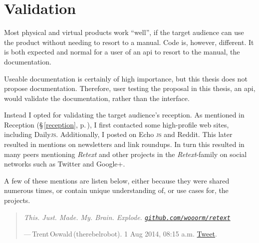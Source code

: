 
\begingroup
\let\clearpage\relax
\let\cleardoublepage\relax
\let\cleardoublepage\relax

\manualmark
{}

\chapter*{Validation}\label{addendum-validation}

Most physical and virtual products work ``well'', if the target audience can
  use the product without needing to resort to a manual.
Code is, however, different.
It is both expected and normal for a user of an \gls{api} to resort
  to the manual, the documentation.

Useable documentation is certainly of high importance, but this thesis does
  not propose documentation.
Therefore, user testing the proposal in this thesis, an \gls{api}, would
  validate the documentation, rather than the interface.

Instead I opted for validating the target audience's reception.
As mentioned in Reception (§\,\ref{reception}, p.\,\pageref{reception}),
  I first contacted some high-profile web sites, including Daily\textsc{js}.
Additionally, I posted on Echo \textsc{js} and Reddit.
This later resulted in mentions on newsletters and link roundups.
In turn this resulted in many peers mentioning \emph{Retext} and other
  projects in the \emph{Retext}-family on social networks such as Twitter
  and Google+.

A few of these mentions are listen below, either because they were shared
  numerous times, or contain unique understanding of, or use cases for, the
  projects.

\begin{quote}
  \textit{This. Just. Made. My. Brain. Explode.
    \href{https://github.com/wooorm/retext}{\nolinkurl{github.com/wooorm/retext}}
  }

  \medskip ---\,Trent\,Oswald\,(therebelrobot). 1 Aug 2014, 08:15 a.m.
  \href{https://twitter.com/therebelrobot/status/495226217805524992}{Tweet}.
\end{quote}

